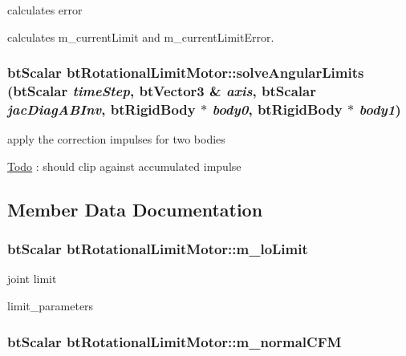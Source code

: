 calculates error 

calculates m\_\-currentLimit and m\_\-currentLimitError. \hypertarget{classbt_rotational_limit_motor_d52e9b1c402c7bdd47fb1a9de28afb7e}{
\subsubsection[solveAngularLimits]{\setlength{\rightskip}{0pt plus 5cm}btScalar btRotationalLimitMotor::solveAngularLimits (btScalar {\em timeStep}, \/  btVector3 \& {\em axis}, \/  btScalar {\em jacDiagABInv}, \/  {\bf btRigidBody} $\ast$ {\em body0}, \/  {\bf btRigidBody} $\ast$ {\em body1})}}
\label{classbt_rotational_limit_motor_d52e9b1c402c7bdd47fb1a9de28afb7e}


apply the correction impulses for two bodies 



\begin{Desc}
\item[\hyperlink{todo__todo000028}{Todo}]: should clip against accumulated impulse \end{Desc}


\subsection{Member Data Documentation}
\hypertarget{classbt_rotational_limit_motor_57ff414e1856d661d81b797702c4f986}{
\subsubsection[m\_\-loLimit]{\setlength{\rightskip}{0pt plus 5cm}btScalar {\bf btRotationalLimitMotor::m\_\-loLimit}}}
\label{classbt_rotational_limit_motor_57ff414e1856d661d81b797702c4f986}


joint limit 

limit\_\-parameters \hypertarget{classbt_rotational_limit_motor_3d06f5a5de013fd97f39cf63273dce45}{
\subsubsection[m\_\-normalCFM]{\setlength{\rightskip}{0pt plus 5cm}btScalar {\bf btRotationalLimitMotor::m\_\-normalCFM}}}
\label{classbt_rotational_limit_motor_3d06f5a5de013fd97f39cf63273dce45}


